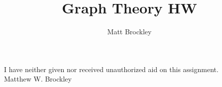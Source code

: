 \documentclass[12pt, letterpaper]{article}
\author{Matt Brockley}
\title{Graph Theory HW}
\begin{document}
	
	
	
	\begin{center}
		I have neither given nor received unauthorized aid on this assignment.\\
		Matthew W. Brockley	
	\end{center}
\end{document}

